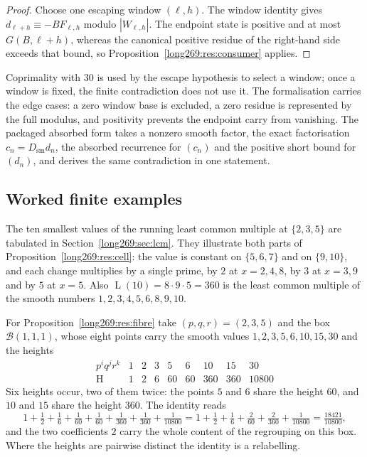 \documentclass[11pt]{article}
\newcommand{\hgt}{\operatorname{H}}
\newcommand{\Lprefix}{\operatorname{L}}
\begin{document}
\begin{proof}
Choose one escaping window $(\ell,h)$.  The window identity gives
$d_{\ell+h}\equiv-BF_{\ell,h}$ modulo $|W_{\ell,h}|$.  The endpoint state is
positive and at most $G(B,\ell+h)$, whereas the canonical positive residue of
the right-hand side exceeds that bound, so Proposition~\ref{long269:res:consumer}
applies.
\end{proof}

Coprimality with $30$ is used by the escape hypothesis to select a window; once
a window is fixed, the finite contradiction does not use it.  The formalisation
carries the edge cases: a zero window base is excluded, a zero residue is
represented by the full modulus, and positivity prevents the endpoint carry
from vanishing.  The packaged absorbed form takes a nonzero smooth factor, the
exact factorisation $c_n=D_{\mathrm{sm}}d_n$, the absorbed recurrence for
$(c_n)$ and the positive short bound for $(d_n)$, and derives the same
contradiction in one statement.

\subsection{Worked finite examples}\label{long269:long:finite-geometry}

The ten smallest values of the running least common multiple at $\{2,3,5\}$ are
tabulated in Section~\ref{long269:sec:lcm}.  They illustrate both parts of
Proposition~\ref{long269:res:cell}: the value is constant on $\{5,6,7\}$ and on
$\{9,10\}$, and each change multiplies by a single prime, by $2$ at
$x=2,4,8$, by $3$ at $x=3,9$ and by $5$ at $x=5$.  Also $\Lprefix(10)=8\cdot9\cdot5=360$
is the least common multiple of the smooth numbers $1,2,3,4,5,6,8,9,10$.

For Proposition~\ref{long269:res:fibre} take $(p,q,r)=(2,3,5)$ and the box
$\mathcal B(1,1,1)$, whose eight points carry the smooth values
$1,2,3,5,6,10,15,30$ and the heights
\[
\begin{array}{c|cccccccc}
p^{i}q^{j}r^{k}&1&2&3&5&6&10&15&30\\ \hline
\hgt&1&2&6&60&60&360&360&10800
\end{array}
\]
Six heights occur, two of them twice: the points $5$ and $6$ share the height
$60$, and $10$ and $15$ share the height $360$.  The identity reads
\[
 1+\tfrac12+\tfrac16+\tfrac1{60}+\tfrac1{60}+\tfrac1{360}+\tfrac1{360}
 +\tfrac1{10800}
 =1+\tfrac12+\tfrac16+\tfrac2{60}+\tfrac2{360}+\tfrac1{10800}
 =\tfrac{18421}{10800},
\]
and the two coefficients $2$ carry the whole content of the regrouping on this
box.  Where the heights are pairwise distinct the identity is a relabelling.
\end{document}
